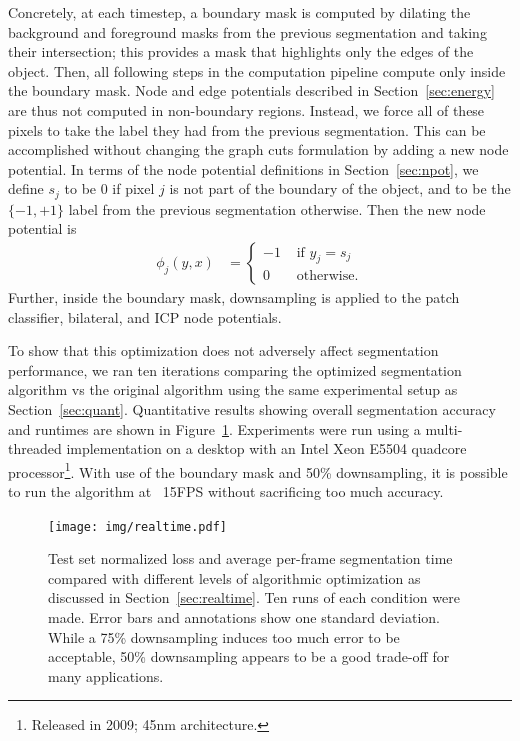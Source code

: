 \documentclass[graybox]{svmult}
\begin{document}
Concretely, at each timestep, a boundary mask is computed by dilating the background and foreground masks from the previous segmentation and taking their intersection; this provides a mask that highlights only the edges of the object.  Then, all following steps in the computation pipeline compute only inside the boundary mask.  Node and edge potentials described in Section~\ref{sec:energy} are thus not computed in non-boundary regions.  Instead, we force all of these pixels to take the label they had from the previous segmentation.  This can be accomplished without changing the graph cuts formulation by adding a new node potential.  In terms of the node potential definitions in Section~\ref{sec:npot}, we define $s_j$ to be 0 if pixel $j$ is not part of the boundary of the object, and to be the $\{-1, +1\}$ label from the previous segmentation otherwise.  Then the new node potential is
\begin{align*}
  \phi_j(y, x) & =
  \left\{
  \begin{array}{rl}
    -1 & \mbox{ if } y_j = s_j \\
    0 & \mbox{ otherwise.}
  \end{array}
  \right.
\end{align*}
Further, inside the boundary mask, downsampling is applied to the patch classifier, bilateral, and ICP node potentials.

To show that this optimization does not adversely affect segmentation performance, we ran ten iterations comparing the optimized segmentation algorithm vs the original algorithm using the same experimental setup as Section~\ref{sec:quant}.  Quantitative results showing overall segmentation accuracy and runtimes are shown in Figure~\ref{fig:realtime}. Experiments were run using a multi-threaded implementation on a desktop with an Intel Xeon E5504 quadcore processor\footnote{Released in 2009; 45nm architecture.}.  With use of the boundary mask and 50\% downsampling, it is possible to run the algorithm at ~15FPS without sacrificing too much accuracy.    

\begin{figure}
  \centering
  \texttt{[image: img/realtime.pdf]}
  \caption{Test set normalized loss and average per-frame segmentation time compared with different levels of algorithmic optimization as discussed in Section~\ref{sec:realtime}.  Ten runs of each condition were made.  Error bars and annotations show one standard deviation.  While a 75\% downsampling induces too much error to be acceptable, 50\% downsampling appears to be a good trade-off for many applications.}
  \label{fig:realtime}
\end{figure}
\end{document}
